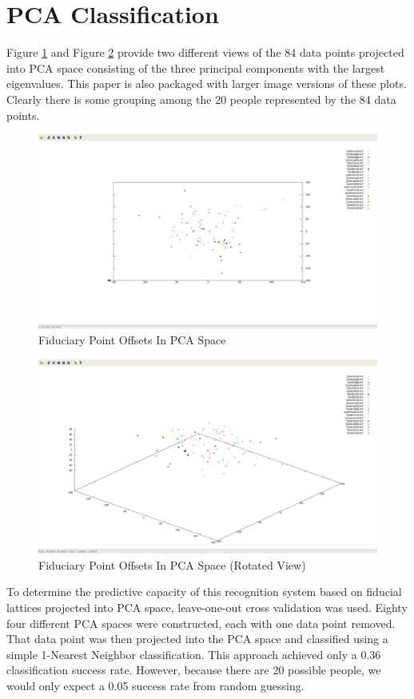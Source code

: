 \documentclass[12pt]{article}
\begin{document}
\section{PCA Classification}

Figure \ref{pca1} and Figure \ref{pca2} provide two different views of the 84 data points projected into PCA space consisting of the three principal components with the largest eigenvalues. This paper is also packaged with larger image versions of these plots. Clearly there is some grouping among the 20 people represented by the 84 data points.

\begin{figure}
\centering
\includegraphics[width=1.00\textwidth]{problem1-fid-pca-1.png}
\caption{Fiduciary Point Offsets In PCA Space}
\label{pca1}
\end{figure}

\begin{figure}
\centering
\includegraphics[width=1.00\textwidth]{problem1-fid-pca-2.png}
\caption{Fiduciary Point Offsets In PCA Space (Rotated View)}
\label{pca2}
\end{figure}

To determine the predictive capacity of this recognition system based on fiducial lattices projected into PCA space, leave-one-out cross validation was used. Eighty four different PCA spaces were constructed, each with one data point removed. That data point was then projected into the PCA space and classified using a simple 1-Nearest Neighbor classification. This approach achieved only a 0.36 classification success rate. However, because there are 20 possible people, we would only expect a 0.05 success rate from random guessing.
\end{document}
